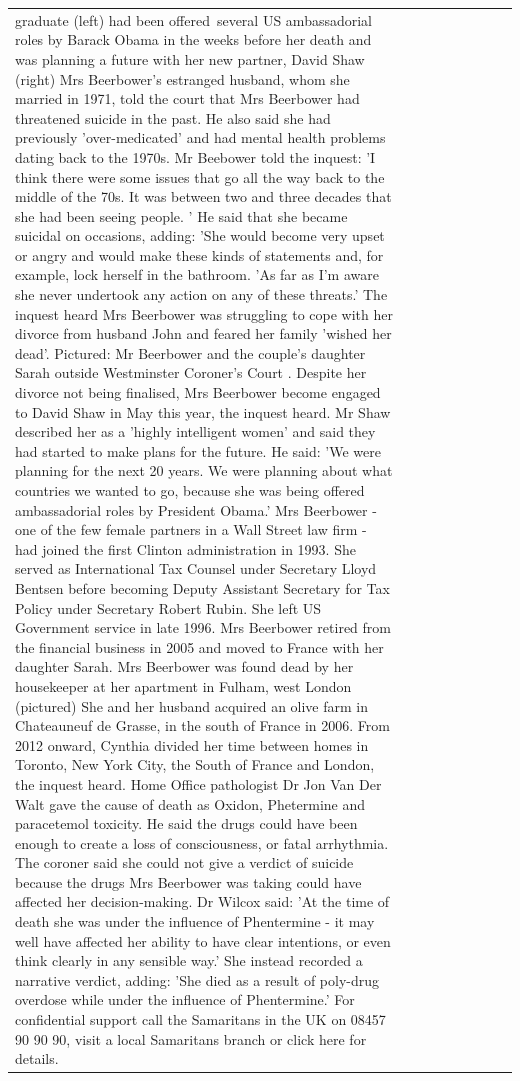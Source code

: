 \begin{table}[H]
\begin{tabular}{lllrlllll}
graduate (left) had been offered several US ambassadorial roles by Barack Obama in the weeks before her death and was planning a future with her new partner, David Shaw (right) Mrs Beerbower's estranged husband, whom she married in 1971, told the court that Mrs Beerbower had threatened suicide in the past. He also said she had previously 'over-medicated' and had mental health problems dating back to the 1970s. Mr Beebower told the inquest: 'I think there were some issues that go all the way back to the middle of the 70s. It was between two and three decades that she had been seeing people. ' He said that she became suicidal on occasions, adding: 'She would become very upset or angry and would make these kinds of statements and, for example, lock herself in the bathroom. 'As far as I'm aware she never undertook any action on any of these threats.' The inquest heard Mrs Beerbower was struggling to cope with her divorce from husband John and feared her family 'wished her dead'. Pictured: Mr Beerbower and the couple's daughter Sarah outside Westminster Coroner's Court . Despite her divorce not being finalised, Mrs Beerbower become engaged to David Shaw in May this year, the inquest heard. Mr Shaw described her as a 'highly intelligent women' and said they had started to make plans for the future. He said: 'We were planning for the next 20 years. We were planning about what countries we wanted to go, because she was being offered ambassadorial roles by President Obama.' Mrs Beerbower - one of the few female partners in a Wall Street law firm - had joined the first Clinton administration in 1993. She served as International Tax Counsel under Secretary Lloyd Bentsen before becoming Deputy Assistant Secretary for Tax Policy under Secretary Robert Rubin. She left US Government service in late 1996. Mrs Beerbower retired from the financial business in 2005 and moved to France with her daughter Sarah. Mrs Beerbower was found dead by her housekeeper at her apartment in Fulham, west London (pictured) She and her husband acquired an olive farm in Chateauneuf de Grasse, in the south of France in 2006. From 2012 onward, Cynthia divided her time between homes in Toronto, New York City, the South of France and London, the inquest heard. Home Office pathologist Dr Jon Van Der Walt gave the cause of death as Oxidon, Phetermine and paracetemol toxicity. He said the drugs could have been enough to create a loss of consciousness, or fatal arrhythmia. The coroner said she could not give a verdict of suicide because the drugs Mrs Beerbower was taking could have affected her decision-making. Dr Wilcox said: 'At the time of death she was under the influence of Phentermine - it may well have affected her ability to have clear intentions, or even think clearly in any sensible way.' She instead recorded a narrative verdict, adding: 'She died as a result of poly-drug overdose while under the influence of Phentermine.' For confidential support call the Samaritans in the UK on 08457 90 90 90, visit a local Samaritans branch or click here for details.

\end{tabular}
\end{table}
